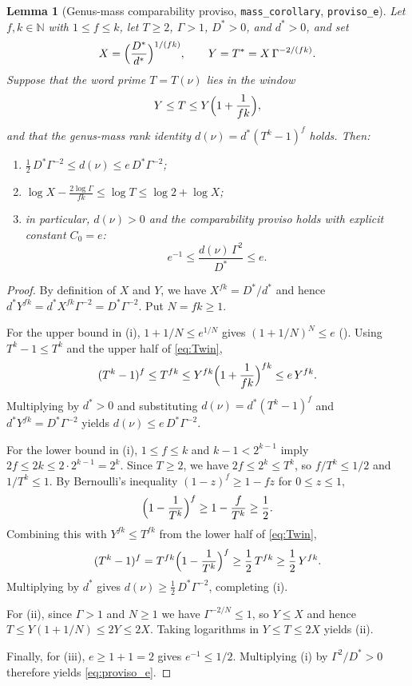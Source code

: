 \documentclass[11pt]{amsart}
\newcommand{\N}{\mathbb{N}}
\theoremstyle{plain}
\newtheorem{lemma}[theorem]{Lemma}
\theoremstyle{definition}
\numberwithin{equation}{section}
\begin{document}
\begin{lemma}[Genus-mass comparability proviso, \texttt{mass\_corollary}, \texttt{proviso\_e}]\label{lem:proviso}
Let $f,k\in\N$ with $1\le f\le k$, let $T\ge2$, $\Gamma>1$, $D^\ast>0$, and $d^\ast>0$, and set
\[
X=\Bigl(\frac{D^\ast}{d^\ast}\Bigr)^{1/(fk)},\qquad
Y=T^\ast=X\,\Gamma^{-2/(fk)}.
\]
Suppose that the word prime $T=T(\nu)$ lies in the window
\begin{equation}\label{eq:Twin}
Y\le T\le Y\Bigl(1+\frac{1}{fk}\Bigr),
\end{equation}
and that the genus-mass rank identity $d(\nu)=d^\ast(T^k-1)^f$ holds. Then:
\begin{enumerate}[label=(\roman*)]
\item $\frac12\,D^\ast\Gamma^{-2}\le d(\nu)\le e\,D^\ast\Gamma^{-2}$;
\item $\log X-\frac{2\log\Gamma}{fk}\le\log T\le\log 2+\log X$;
\item in particular, $d(\nu)>0$ and the comparability proviso  holds with
  explicit constant $C_0=e$:
  \begin{equation}\label{eq:proviso_e}
  e^{-1}\le\frac{d(\nu)\,\Gamma^2}{D^\ast}\le e.
  \end{equation}
\end{enumerate}
\end{lemma}

\begin{proof}
By definition of $X$ and $Y$, we have $X^{fk}=D^\ast/d^\ast$ and hence
$d^\ast Y^{fk}=d^\ast X^{fk}\Gamma^{-2}=D^\ast\Gamma^{-2}$. Put $N=fk\ge1$.

For the upper bound in (i), $1+1/N\le e^{1/N}$ gives $(1+1/N)^N\le e$
(). Using $T^k-1\le T^k$ and the upper half of \eqref{eq:Twin},
\[
(T^k-1)^f\le T^{fk}\le Y^{fk}\Bigl(1+\frac{1}{fk}\Bigr)^{fk}\le e\,Y^{fk}.
\]
Multiplying by $d^\ast>0$ and substituting $d(\nu)=d^\ast(T^k-1)^f$ and
$d^\ast Y^{fk}=D^\ast\Gamma^{-2}$ yields $d(\nu)\le e\,D^\ast\Gamma^{-2}$.

For the lower bound in (i), $1\le f\le k$ and $k-1<2^{k-1}$ imply $2f\le 2k\le 2\cdot 2^{k-1}=2^k$.
Since $T\ge2$, we have $2f\le 2^k\le T^k$, so $f/T^k\le 1/2$ and $1/T^k\le 1$. By Bernoulli's
inequality $(1-z)^f\ge 1-fz$ for $0\le z\le 1$,
\[
\Bigl(1-\frac{1}{T^k}\Bigr)^f\ge 1-\frac{f}{T^k}\ge\frac12.
\]
Combining this with $Y^{fk}\le T^{fk}$ from the lower half of \eqref{eq:Twin},
\[
(T^k-1)^f=T^{fk}\Bigl(1-\frac{1}{T^k}\Bigr)^f\ge\frac12\,T^{fk}\ge\frac12\,Y^{fk}.
\]
Multiplying by $d^\ast$ gives $d(\nu)\ge\frac12\,D^\ast\Gamma^{-2}$, completing (i).

For (ii), since $\Gamma>1$ and $N\ge1$ we have $\Gamma^{-2/N}\le 1$, so $Y\le X$ and hence
$T\le Y(1+1/N)\le 2Y\le 2X$. Taking logarithms in $Y\le T\le 2X$ yields (ii).

Finally, for (iii), $e\ge 1+1=2$ gives $e^{-1}\le 1/2$. Multiplying (i) by $\Gamma^2/D^\ast>0$
therefore yields \eqref{eq:proviso_e}.
\end{proof}
\end{document}
